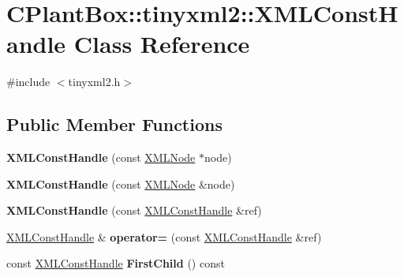 \hypertarget{classCPlantBox_1_1tinyxml2_1_1XMLConstHandle}{}\section{C\+Plant\+Box\+:\+:tinyxml2\+:\+:X\+M\+L\+Const\+Handle Class Reference}
\label{classCPlantBox_1_1tinyxml2_1_1XMLConstHandle}


{\ttfamily \#include $<$tinyxml2.\+h$>$}

\subsection*{Public Member Functions}
\begin{DoxyCompactItemize}
\item 
\mbox{\label{classCPlantBox_1_1tinyxml2_1_1XMLConstHandle_ad16b82c2d46c1dde8a72bcfdcae1f378}} 
{\bfseries X\+M\+L\+Const\+Handle} (const \hyperlink{classCPlantBox_1_1tinyxml2_1_1XMLNode}{X\+M\+L\+Node} $\ast$node)
\item 
\mbox{\label{classCPlantBox_1_1tinyxml2_1_1XMLConstHandle_a2217f375c0347d33bc0972731672b299}} 
{\bfseries X\+M\+L\+Const\+Handle} (const \hyperlink{classCPlantBox_1_1tinyxml2_1_1XMLNode}{X\+M\+L\+Node} \&node)
\item 
\mbox{\label{classCPlantBox_1_1tinyxml2_1_1XMLConstHandle_a2a65acb1f3805658f9621d7e4cfdd260}} 
{\bfseries X\+M\+L\+Const\+Handle} (const \hyperlink{classCPlantBox_1_1tinyxml2_1_1XMLConstHandle}{X\+M\+L\+Const\+Handle} \&ref)
\item 
\mbox{\label{classCPlantBox_1_1tinyxml2_1_1XMLConstHandle_a39ad25cefeb2208c81c6a07e4e3638cc}} 
\hyperlink{classCPlantBox_1_1tinyxml2_1_1XMLConstHandle}{X\+M\+L\+Const\+Handle} \& {\bfseries operator=} (const \hyperlink{classCPlantBox_1_1tinyxml2_1_1XMLConstHandle}{X\+M\+L\+Const\+Handle} \&ref)
\item 
\mbox{\label{classCPlantBox_1_1tinyxml2_1_1XMLConstHandle_a0450457ba61f000f93ead448c1bc13cd}} 
const \hyperlink{classCPlantBox_1_1tinyxml2_1_1XMLConstHandle}{X\+M\+L\+Const\+Handle} {\bfseries First\+Child} () const

\end{DoxyCompactItemize}
